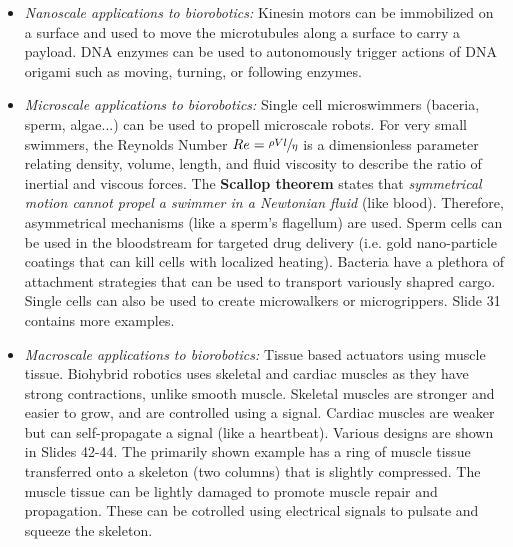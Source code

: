 \documentclass[onecolumn,a4paper]{article}
\begin{document}
\begin{itemize}
    \item \emph{Nanoscale applications to biorobotics:} Kinesin motors can be immobilized on a surface and used to move the microtubules along a surface to carry a payload. DNA enzymes can be used to autonomously trigger actions of DNA origami such as moving, turning, or following enzymes.
    
    \item \emph{Microscale applications to biorobotics:} Single cell microswimmers (baceria, sperm, algae...) can be used to propell microscale robots. For very small swimmers, the Reynolds Number $Re = \sfrac{\rho V l}{\eta}$ is a dimensionless parameter relating density, volume, length, and fluid viscosity to describe the ratio of inertial and viscous forces. The \textbf{Scallop theorem} states that \emph{symmetrical motion cannot propel a swimmer in a Newtonian fluid} (like blood). Therefore, asymmetrical mechanisms (like a sperm's flagellum) are used. Sperm cells can be used in the bloodstream for targeted drug delivery (i.e. gold nano-particle coatings that can kill cells with localized heating). Bacteria have a plethora of attachment strategies that can be used to transport variously shapred cargo. Single cells can also be used to create microwalkers or microgrippers. Slide 31 contains more examples.
    
    \item \emph{Macroscale applications to biorobotics:} Tissue based actuators using muscle tissue. Biohybrid robotics uses skeletal and cardiac muscles as they have strong contractions, unlike smooth muscle. Skeletal muscles are stronger and easier to grow, and are controlled using a signal. Cardiac muscles are weaker but can self-propagate a signal (like a heartbeat). Various designs are shown in Slides 42-44. The primarily shown example has a ring of muscle tissue transferred onto a skeleton (two columns) that is slightly compressed. The muscle tissue can be lightly damaged to promote muscle repair and propagation. These can be cotrolled using electrical signals to pulsate and squeeze the skeleton.
\end{itemize}
\end{document}
